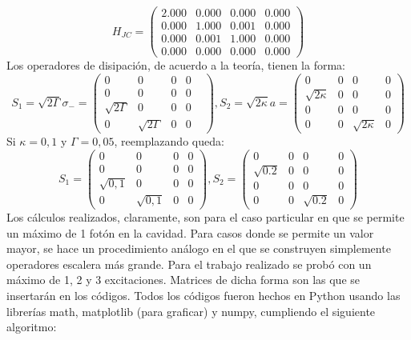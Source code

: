 \documentclass{book}
\begin{document}
\begin{equation}{H_{JC}=\begin{pmatrix} 2.000 & 0.000 & 0.000 & 0.000 \\ 0.000 & 1.000 & 0.001 & 0.000 \\ 0.000 & 0.001 & 1.000 & 0.000 \\ 0.000 & 0.000 & 0.000  & 0.000\end{pmatrix}}\end{equation}
Los operadores de disipación, de acuerdo a la teoría, tienen la forma: 
\begin{equation}{S_1= \sqrt{2\Gamma}\sigma_-=\begin{pmatrix} 0&0&0&0& \\ 0&0&0&0 \\ \sqrt{2\Gamma}&0&0&0 \\ 0&\sqrt{2\Gamma} & 0&0 \end{pmatrix}, S_2=\sqrt{2\kappa}a=\begin{pmatrix} 0&0&0&0 \\ \sqrt{2\kappa}&0&0&0 \\ 0&0&0&0 \\ 0&0&\sqrt{2\kappa}&0\end{pmatrix} }\end{equation}
Si ${\kappa=0,1}$ y ${\Gamma=0,05}$, reemplazando queda:
\begin{equation}{S_1=\begin{pmatrix}0&0&0&0\\0&0&0&0\\ \sqrt{0,1}&0&0&0\\ 0&\sqrt{0,1}&0&0 \end{pmatrix},S_2=\begin{pmatrix}0&0&0&0 \\ \sqrt{0.2}&0&0&0 \\ 0&0&0&0 \\ 0&0&\sqrt{0.2}&0\end{pmatrix}}\end{equation}
Los cálculos realizados, claramente, son para el caso particular en que se permite un máximo de 1 fotón en la cavidad. Para casos donde se permite un valor mayor, se hace un procedimiento análogo en el que se construyen simplemente operadores escalera más grande. Para el trabajo realizado se probó con un máximo de 1, 2 y 3 excitaciones. Matrices de dicha forma son las que se insertarán en los códigos. Todos los códigos fueron hechos en Python usando las librerías math, matplotlib (para graficar) y numpy, cumpliendo el siguiente algoritmo:
\end{document}
